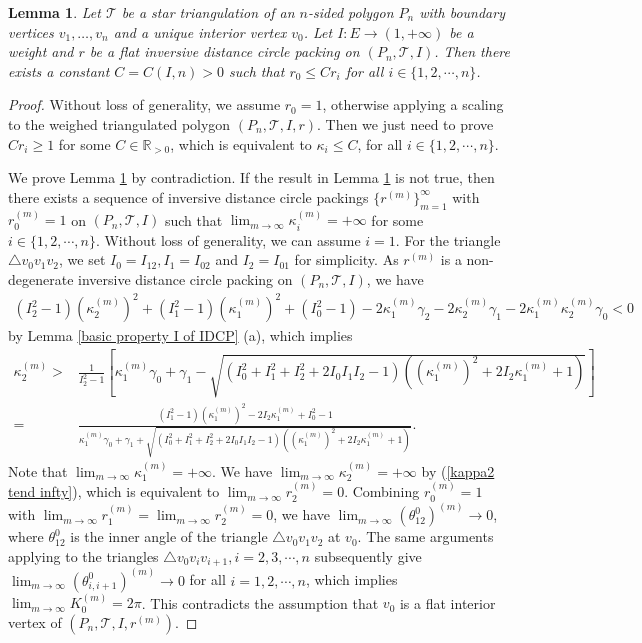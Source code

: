 \documentclass[12pt]{amsart}
\newtheorem{lemma}[theorem]{Lemma}
\begin{document}
\begin{lemma}\label{ring lemma}
  Let $\mathcal{T}$ be a star triangulation of an $n$-sided polygon $P_n$ with boundary vertices $v_1,\dots, v_n$ and a unique interior vertex $v_0$.
Let  $I:E\rightarrow (1, +\infty)$ be a weight and $r$ be a flat inversive distance circle packing on $(P_n,\mathcal{T}, I)$.
Then there exists a constant $C = C(I, n)>0$ such that $r_0\leq C r_i$ for all $i\in \{1,2, \cdots, n\}$.
\end{lemma}
\begin{proof}
Without loss of generality, we assume $r_0= 1$, otherwise applying a scaling to
the weighed triangulated polygon $(P_n,\mathcal{T}, I, r)$.
Then we just need to prove $Cr_i\geq 1$ for some $C\in \mathbb{R}_{>0}$, which is equivalent to $\kappa_i\leq C$, for all $i\in \{1,2, \cdots, n\}$.

We prove Lemma \ref{ring lemma} by contradiction.
If the result in Lemma \ref{ring lemma} is not true, then there exists a sequence of
inversive distance circle packings $\{r^{(m)}\}_{m=1}^\infty$ with $r^{(m)}_0=1$ on $(P_n,\mathcal{T}, I)$ such that $\lim_{m\rightarrow \infty}\kappa^{(m)}_{i}=+\infty$
for some $i\in \{1,2, \cdots, n\}$.
Without loss of generality, we can assume $i=1$. For the triangle $\triangle v_0v_1v_2$, we set $I_0=I_{12}, I_1=I_{02}$ and $I_2=I_{01}$ for simplicity. As $r^{(m)}$ is a non-degenerate inversive distance circle packing on $(P_n,\mathcal{T}, I)$, we have
\begin{align*}
  (I_2^2-1)(\kappa^{(m)}_2)^2+(I_1^2-1)(\kappa^{(m)}_1)^2+(I_0^2-1)
  -2\kappa^{(m)}_1\gamma_2-2\kappa^{(m)}_2\gamma_1-2\kappa^{(m)}_1\kappa^{(m)}_2\gamma_0< 0
\end{align*}
by Lemma \ref{basic property I of IDCP} (a), which implies
\begin{equation}\label{kappa2 tend infty}
\begin{aligned}
\kappa^{(m)}_2
>& \frac{1}{I_2^2-1}[\kappa^{(m)}_1\gamma_0+\gamma_1
-\sqrt{(I_{0}^2+I_1^2+I_2^2+2I_{0}I_1I_2-1)((\kappa^{(m)}_1)^2+2I_2\kappa^{(m)}_1+1)}]\\
=&\frac{(I_1^2-1)(\kappa^{(m)}_1)^2-2I_2\kappa^{(m)}_1+I_0^2-1}{\kappa^{(m)}_1\gamma_0+\gamma_1
+\sqrt{(I_{0}^2+I_1^2+I_2^2+2I_{0}I_1I_2-1)((\kappa^{(m)}_1)^2+2I_2\kappa^{(m)}_1+1)}}.
\end{aligned}
\end{equation}
Note that $\lim_{m\rightarrow \infty}\kappa^{(m)}_{1}=+\infty$.
We have $\lim_{m\rightarrow \infty}\kappa^{(m)}_2=+\infty$ by (\ref{kappa2 tend infty}),
which is equivalent to $\lim_{m\rightarrow \infty}r^{(m)}_2=0$.
Combining $r^{(m)}_0=1$ with $\lim_{m\rightarrow \infty}r^{(m)}_{1}=\lim_{m\rightarrow \infty}r^{(m)}_2=0$, we have $\lim_{m\rightarrow \infty}(\theta^0_{12})^{(m)}\rightarrow 0$, where $\theta^0_{12}$ is the inner angle of the triangle $\triangle v_0v_1v_2$ at $v_0$.
The same arguments applying to the triangles $\triangle v_0v_iv_{i+1}, i=2, 3, \cdots, n$ subsequently give
$\lim_{m\rightarrow \infty}(\theta^0_{i, i+1})^{(m)}\rightarrow 0$ for all $i=1, 2, \cdots, n$, which implies
$\lim_{m\rightarrow \infty}K^{(m)}_0=2\pi$.
This contradicts the assumption that $v_0$ is a flat interior vertex of $(P_n,\mathcal{T}, I, r^{(m)})$.
\end{proof}
\end{document}
